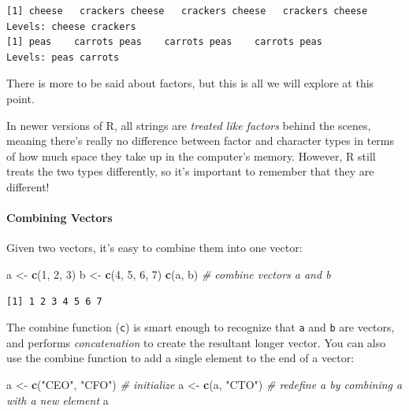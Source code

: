 \documentclass[
]{article}
\newenvironment{Shaded}{\begin{snugshade}}{\end{snugshade}}
\newcommand{\CommentTok}[1]{\textcolor[rgb]{0.56,0.35,0.01}{\textit{#1}}}
\newcommand{\DecValTok}[1]{\textcolor[rgb]{0.00,0.00,0.81}{#1}}
\newcommand{\KeywordTok}[1]{\textcolor[rgb]{0.13,0.29,0.53}{\textbf{#1}}}
\newcommand{\NormalTok}[1]{#1}
\newcommand{\StringTok}[1]{\textcolor[rgb]{0.31,0.60,0.02}{#1}}
\newenvironment{bonus}{
  \specialblock{bonus}{sun-fill.png}{Bonus}
}{\endspecialblock}
\begin{document}
\begin{verbatim}
[1] cheese   crackers cheese   crackers cheese   crackers cheese  
Levels: cheese crackers
[1] peas    carrots peas    carrots peas    carrots peas   
Levels: peas carrots
\end{verbatim}

There is more to be said about factors, but this is all we will explore at this point.

\begin{bonus}
In newer versions of R, all strings are \emph{treated like factors}
behind the scenes, meaning there's really no difference between factor
and character types in terms of how much space they take up in the
computer's memory. However, R still treats the two types differently, so
it's important to remember that they are different!
\end{bonus}

\hypertarget{combining-vectors}{%
\paragraph{Combining Vectors}\label{combining-vectors}}

Given two vectors, it's easy to combine them into one vector:

\begin{Shaded}
\begin{Highlighting}[]
\NormalTok{a <-}\StringTok{ }\KeywordTok{c}\NormalTok{(}\DecValTok{1}\NormalTok{, }\DecValTok{2}\NormalTok{, }\DecValTok{3}\NormalTok{)}
\NormalTok{b <-}\StringTok{ }\KeywordTok{c}\NormalTok{(}\DecValTok{4}\NormalTok{, }\DecValTok{5}\NormalTok{, }\DecValTok{6}\NormalTok{, }\DecValTok{7}\NormalTok{)}
\KeywordTok{c}\NormalTok{(a, b)   }\CommentTok{# combine vectors a and b}
\end{Highlighting}
\end{Shaded}

\begin{verbatim}
[1] 1 2 3 4 5 6 7
\end{verbatim}

The combine function (\texttt{c}) is smart enough to recognize that \texttt{a} and \texttt{b} are vectors, and performs \emph{concatenation} to create the resultant longer vector.
You can also use the combine function to add a single element to the end of a vector:

\begin{Shaded}
\begin{Highlighting}[]
\NormalTok{a <-}\StringTok{ }\KeywordTok{c}\NormalTok{(}\StringTok{"CEO"}\NormalTok{, }\StringTok{"CFO"}\NormalTok{)   }\CommentTok{# initialize }
\NormalTok{a <-}\StringTok{ }\KeywordTok{c}\NormalTok{(a, }\StringTok{"CTO"}\NormalTok{)       }\CommentTok{# redefine a by combining a with a new element}
\NormalTok{a}
\end{Highlighting}
\end{Shaded}
\end{document}
